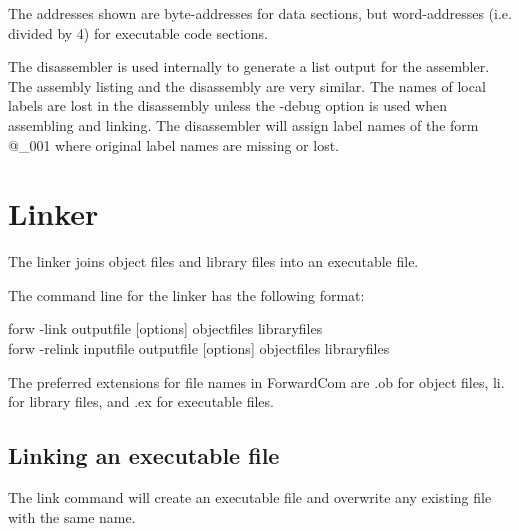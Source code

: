 \documentclass[forwardcom.tex]{subfiles}
\begin{document}
The addresses shown are byte-addresses for data sections, but word-addresses (i.e. divided by 4) for executable code sections.
\vv

The disassembler is used internally to generate a list output for the assembler. The  assembly listing and the disassembly are very similar. The names of local labels are lost in the disassembly unless the -debug option is used when assembling and linking.
 The disassembler will assign label names of the form @\_001 where original label names are missing or lost.
\vv


\section{Linker} \label{linker}

The linker joins object files and library files into an executable file.

The command line for the linker has the following format:
\vv

{\ttfamily 
\hspace{5mm} forw -link   outputfile [options] objectfiles libraryfiles \\
\hspace{5mm} forw -relink inputfile outputfile [options] objectfiles libraryfiles
}
\vv

The preferred extensions for file names in ForwardCom are .ob for object files, li. for library files, and .ex for executable files.
\vv

\subsection{Linking an executable file} \label{linking}
The link command will create an executable file and overwrite any existing file with the same name.
\vv
\end{document}
